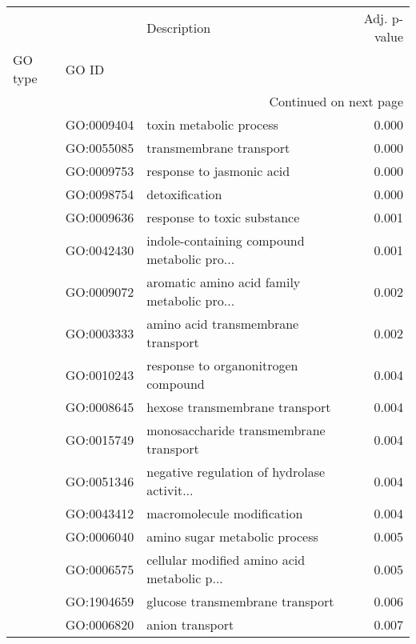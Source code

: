 \begin{longtable}{lllr}
\toprule
   &            &                                  Description &  Adj. p-value \\
GO type & GO ID &                                              &               \\
\midrule
\endhead
\midrule
\multicolumn{4}{r}{{Continued on next page}} \\
\midrule
\endfoot

\bottomrule
\endlastfoot
\multirow{73}{*}{BP} & GO:0009404 &                      toxin metabolic process &         0.000 \\
   & GO:0055085 &                      transmembrane transport &         0.000 \\
   & GO:0009753 &                    response to jasmonic acid &         0.000 \\
   & GO:0098754 &                               detoxification &         0.000 \\
   & GO:0009636 &                  response to toxic substance &         0.001 \\
   & GO:0042430 &  indole-containing compound metabolic pro... &         0.001 \\
   & GO:0009072 &  aromatic amino acid family metabolic pro... &         0.002 \\
   & GO:0003333 &           amino acid transmembrane transport &         0.002 \\
   & GO:0010243 &          response to organonitrogen compound &         0.004 \\
   & GO:0008645 &               hexose transmembrane transport &         0.004 \\
   & GO:0015749 &       monosaccharide transmembrane transport &         0.004 \\
   & GO:0051346 &  negative regulation of hydrolase activit... &         0.004 \\
   & GO:0043412 &                   macromolecule modification &         0.004 \\
   & GO:0006040 &                amino sugar metabolic process &         0.005 \\
   & GO:0006575 &  cellular modified amino acid metabolic p... &         0.005 \\
   & GO:1904659 &              glucose transmembrane transport &         0.006 \\
   & GO:0006820 &                              anion transport &         0.007 \\

\end{longtable}
